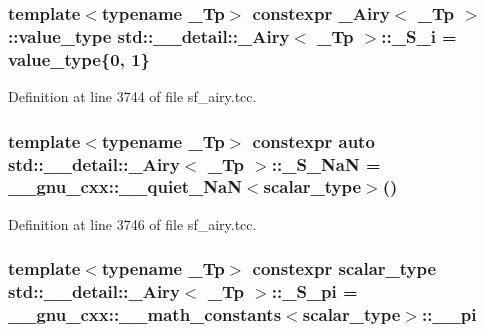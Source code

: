\subsubsection[{\texorpdfstring{\+\_\+\+S\+\_\+i}{_S_i}}]{\setlength{\rightskip}{0pt plus 5cm}template$<$typename \+\_\+\+Tp$>$ constexpr {\bf \+\_\+\+Airy}$<$ \+\_\+\+Tp $>$\+::{\bf value\+\_\+type} {\bf std\+::\+\_\+\+\_\+detail\+::\+\_\+\+Airy}$<$ \+\_\+\+Tp $>$\+::\+\_\+\+S\+\_\+i = {\bf value\+\_\+type}\{0, 1\}\hspace{0.3cm}{\ttfamily [static]}}\hypertarget{classstd_1_1____detail_1_1__Airy_ae5cbd31a89afec0cfb04cc51c1192c5b}{}\label{classstd_1_1____detail_1_1__Airy_ae5cbd31a89afec0cfb04cc51c1192c5b}


Definition at line 3744 of file sf\+\_\+airy.\+tcc.

\subsubsection[{\texorpdfstring{\+\_\+\+S\+\_\+\+NaN}{_S_NaN}}]{\setlength{\rightskip}{0pt plus 5cm}template$<$typename \+\_\+\+Tp$>$ constexpr auto {\bf std\+::\+\_\+\+\_\+detail\+::\+\_\+\+Airy}$<$ \+\_\+\+Tp $>$\+::\+\_\+\+S\+\_\+\+NaN = \+\_\+\+\_\+gnu\+\_\+cxx\+::\+\_\+\+\_\+quiet\+\_\+\+NaN$<${\bf scalar\+\_\+type}$>$()\hspace{0.3cm}{\ttfamily [static]}}\hypertarget{classstd_1_1____detail_1_1__Airy_a906b2ddeac8ea00ed389d8ba0a4ebcc7}{}\label{classstd_1_1____detail_1_1__Airy_a906b2ddeac8ea00ed389d8ba0a4ebcc7}


Definition at line 3746 of file sf\+\_\+airy.\+tcc.

\subsubsection[{\texorpdfstring{\+\_\+\+S\+\_\+pi}{_S_pi}}]{\setlength{\rightskip}{0pt plus 5cm}template$<$typename \+\_\+\+Tp$>$ constexpr {\bf scalar\+\_\+type} {\bf std\+::\+\_\+\+\_\+detail\+::\+\_\+\+Airy}$<$ \+\_\+\+Tp $>$\+::\+\_\+\+S\+\_\+pi = \+\_\+\+\_\+gnu\+\_\+cxx\+::\+\_\+\+\_\+math\+\_\+constants$<${\bf scalar\+\_\+type}$>$\+::\+\_\+\+\_\+pi\hspace{0.3cm}{\ttfamily [static]}}\hypertarget{classstd_1_1____detail_1_1__Airy_a299a1c3b18fed38b2d35956650c888ed}{}\label{classstd_1_1____detail_1_1__Airy_a299a1c3b18fed38b2d35956650c888ed}



